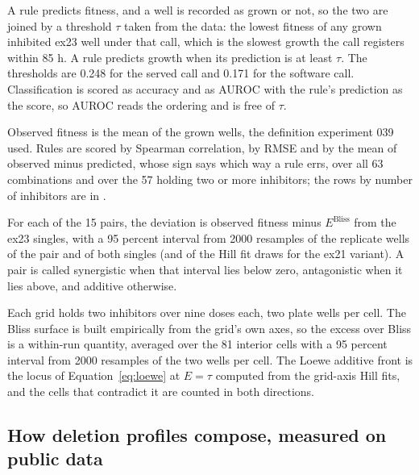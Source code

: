  A rule predicts fitness, and a well is recorded as grown
or not, so the two are joined by a threshold $\tau$ taken from the data: the lowest
fitness of any grown inhibited ex23 well under that call, which is the slowest growth the
call registers within 85 h. A rule predicts growth when its prediction is at least
$\tau$. The thresholds are 0.248 for the served call and 0.171 for the software call.
Classification is scored as accuracy and as AUROC with the rule's prediction as the
score, so AUROC reads the ordering and is free of $\tau$.

 Observed fitness is the mean of the grown
wells, the definition experiment 039 used. Rules are scored by Spearman correlation, by
RMSE and by the mean of observed minus predicted, whose sign says which way a rule errs,
over all 63 combinations and over the 57 holding two or more inhibitors; the rows by
number of inhibitors are in .

 For each of the 15 pairs, the deviation is observed fitness
minus $E^{\text{Bliss}}$ from the ex23 singles, with a 95 percent interval from 2000
resamples of the replicate wells of the pair and of both singles (and of the Hill fit
draws for the ex21 variant). A pair is called synergistic when that interval lies below
zero, antagonistic when it lies above, and additive otherwise.

 Each grid holds two inhibitors over nine doses each, two plate wells
per cell. The Bliss surface is built empirically from the grid's own axes, so the excess
over Bliss is a within-run quantity, averaged over the 81 interior cells with a 95
percent interval from 2000 resamples of the two wells per cell. The Loewe additive front
is the locus of Equation~\ref{eq:loewe} at $E = \tau$ computed from the grid-axis Hill
fits, and the cells that contradict it are counted in both directions.

\subsection{How deletion profiles compose, measured on public data}
\label{sec:het}

